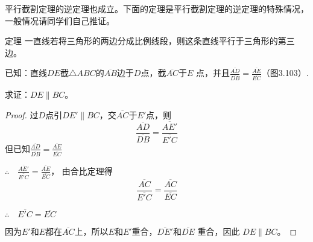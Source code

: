 平行截割定理的逆定理也成立。下面的定理是平行截割定理的逆定理的特殊情况，一般情况请同学们自己推证。

\begin{Theorem}{定理} 
一直线若将三角形的两边分成比例线段，则这条直线平行于三角形的第三边。
\end{Theorem}

\begin{example}
    已知：直线$DE$截$\triangle ABC$的$\overline{AB}$边于$D$点，截$\overline{AC}$于$E$
点，并且$\frac{\overline{AD}}{\overline{DB}}=\frac{\overline{AE}}{\overline{EC}}$（图3.103）.

求证：$DE\parallel BC$。
\end{example}


\begin{proof}
过$D$点引$DE'\parallel BC$，交$\overline{AC}$于$E'$点，则
\[\frac{\overline{AD}}{\overline{DB}}=\frac{\overline{AE'}}{\overline{E'C}}\]
但已知$\frac{\overline{AD}}{\overline{DB}}=\frac{\overline{AE}}{\overline{EC}}$

$\therefore\quad \frac{\overline{AE'}}{\overline{E'C}}=\frac{\overline{AE}}{\overline{EC}}$，
由合比定理得
\[\frac{\overline{AC}}{\overline{E'C}}=\frac{\overline{AC}}{\overline{EC}}\]

$\therefore\quad \overline{E'C}=\overline{EC}$

因为$E'$和$E$都在$\overline{AC}$上，所以$E$和$E'$重合，$\overline{DE'}$和$\overline{DE}$
重合，因此
$DE\parallel BC$。
\end{proof}

